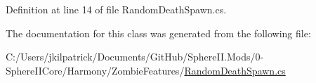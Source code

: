 Definition at line 14 of file Random\+Death\+Spawn.\+cs.



The documentation for this class was generated from the following file\+:\begin{DoxyCompactItemize}
\item 
C\+:/\+Users/jkilpatrick/\+Documents/\+Git\+Hub/\+Sphere\+I\+I.\+Mods/0-\/\+Sphere\+I\+I\+Core/\+Harmony/\+Zombie\+Features/\mbox{\hyperlink{_random_death_spawn_8cs}{Random\+Death\+Spawn.\+cs}}\end{DoxyCompactItemize}
